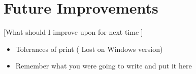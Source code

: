 \section{Future Improvements}


[What should I improve upon for next time  ]
\begin{itemize}
	\item Tolerances of print ( Lost on Windows version)
	\item Remember what you were going to write and put it here
\end{itemize}

